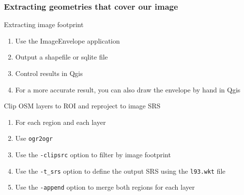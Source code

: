 \documentclass[8pt]{beamer}
\begin{document}
\begin{frame}[fragile]
\frametitle{Extracting geometries that cover our image}
\begin{block}{Extracting image footprint}
\begin{enumerate}
\item Use the ImageEnvelope application
\item Output a shapefile or sqlite file
\item Control results in Qgis
\item For a more accurate result, you can also draw the envelope by hand in Qgis
\end{enumerate}
\end{block}

\begin{block}{Clip OSM layers to ROI and reproject to image SRS}
\begin{enumerate}
\item For each region and each layer
\item Use \texttt{ogr2ogr}
\item Use the \texttt{-clipsrc} option to filter by image footprint
\item Use the \texttt{-t\_srs} option to define the output SRS using the \texttt{l93.wkt} file
\item Use the \texttt{-append} option to merge both regions for each layer
\end{enumerate}
\end{block}

\end{frame}
\end{document}
